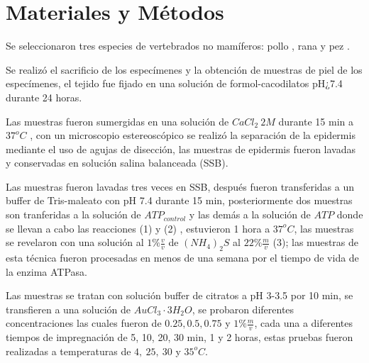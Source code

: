 \section*{Materiales y Métodos}


Se seleccionaron tres especies de vertebrados no mamíferos: pollo , rana  y pez .

Se realizó el sacrificio de los especímenes \cite{web:NOM} y la obtención de muestras de piel de los especímenes, el tejido fue fijado en una solución de formol-cacodilatos pH¿7.4 durante 24 horas.

Las muestras fueron sumergidas en una solución de $CaCl_{2}~2M$ durante 15 min a $37^oC$ \cite{article:epidermis}, con un microscopio estereoscópico se realizó la separación de la epidermis mediante el uso de agujas de disección, las muestras de epidermis fueron lavadas y conservadas en solución salina balanceada (SSB).

\np{~}


Las muestras fueron lavadas tres veces en SSB, después fueron transferidas a un buffer de Tris-maleato con pH 7.4 durante 15 min, posteriormente dos muestras son tranferidas a la solución de $ATP_{control}$ y las demás a la solución de $ATP$ donde se llevan a cabo las reacciones (1) y (2) \cite{article:ATPasaReaction} , estuvieron 1 hora a $37^oC$, las muestras se revelaron con una solución al $1\%\frac{v}{v}$ de $(NH_{4})_{2}S$ al $22\%\frac{m}{v}$ (3); las muestras de esta técnica fueron procesadas en menos de una semana por el tiempo de vida de la enzima ATPasa.







Las muestras se tratan con solución buffer de citratos a pH 3-3.5 por 10 min, se transfieren a una solución de $AuCl_{3}\cdot 3H_{2}O$, se probaron diferentes concentraciones las cuales fueron de $0.25,0.5,0.75$ y $1\% \frac{m}{v}$, cada una a diferentes tiempos de impregnación de 5, 10, 20, 30 min, 1 y 2 horas, estas pruebas fueron realizadas a temperaturas de $4,~25,~30$ y $35^oC$.

